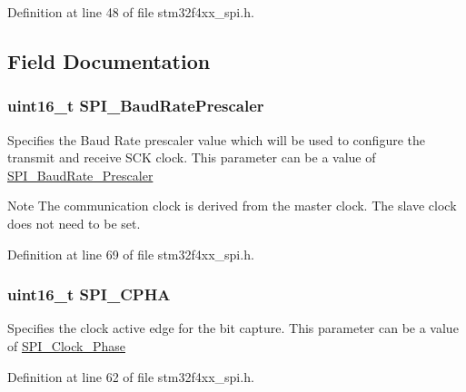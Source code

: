 Definition at line 48 of file stm32f4xx\-\_\-spi.\-h.



\subsection{Field Documentation}
\hypertarget{struct_s_p_i___init_type_def_a35b348a0ba5d3e9a8bc907a7ebe10d13}{
\subsubsection[{S\-P\-I\-\_\-\-Baud\-Rate\-Prescaler}]{\setlength{\rightskip}{0pt plus 5cm}uint16\-\_\-t S\-P\-I\-\_\-\-Baud\-Rate\-Prescaler}}\label{struct_s_p_i___init_type_def_a35b348a0ba5d3e9a8bc907a7ebe10d13}
Specifies the Baud Rate prescaler value which will be used to configure the transmit and receive S\-C\-K clock. This parameter can be a value of \hyperlink{group___s_p_i___baud_rate___prescaler}{S\-P\-I\-\_\-\-Baud\-Rate\-\_\-\-Prescaler} \begin{DoxyNote}{Note}
The communication clock is derived from the master clock. The slave clock does not need to be set. 
\end{DoxyNote}


Definition at line 69 of file stm32f4xx\-\_\-spi.\-h.

\hypertarget{struct_s_p_i___init_type_def_a120f808113ce7d69e2ec1ea65abed627}{
\subsubsection[{S\-P\-I\-\_\-\-C\-P\-H\-A}]{\setlength{\rightskip}{0pt plus 5cm}uint16\-\_\-t S\-P\-I\-\_\-\-C\-P\-H\-A}}\label{struct_s_p_i___init_type_def_a120f808113ce7d69e2ec1ea65abed627}
Specifies the clock active edge for the bit capture. This parameter can be a value of \hyperlink{group___s_p_i___clock___phase}{S\-P\-I\-\_\-\-Clock\-\_\-\-Phase} 

Definition at line 62 of file stm32f4xx\-\_\-spi.\-h.

